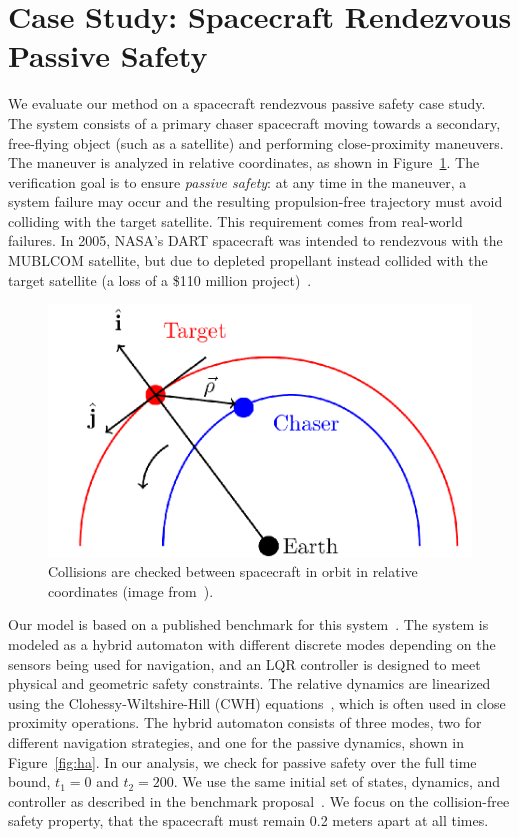 \section{Case Study: Spacecraft Rendezvous Passive Safety}
\label{sec:casestudy}

We evaluate our method on a spacecraft rendezvous passive safety case study. The system consists of a primary chaser spacecraft moving towards a secondary, free-flying object (such as a satellite) and performing close-proximity maneuvers.
%
The maneuver is analyzed in relative coordinates, as shown in Figure~\ref{fig:chaser}.
%
The verification goal is to ensure \emph{passive safety}: at any time in the maneuver, a system failure may occur and the resulting propulsion-free trajectory must avoid colliding with the target satellite.
%
This requirement comes from real-world failures. In 2005, NASA’s DART spacecraft was intended to rendezvous with the MUBLCOM satellite, but due to depleted propellant instead collided with the target satellite (a loss of a
\$110 million project)~\cite{croomes2006overview}.

\begin{figure}[t]
\centerline{\includegraphics[width=0.5\columnwidth]{images/chaser.png}}
\caption{Collisions are checked between spacecraft in orbit in relative coordinates (image from~\cite{chan2017verifying}).}
\label{fig:chaser}
\end{figure}

Our model is based on a published benchmark for this system~\cite{chan2017verifying,jewison2016spacecraft}. The system is modeled as a hybrid automaton with different discrete modes depending on the sensors being used for navigation, and an LQR controller is designed to meet physical and geometric safety constraints.
%
The relative dynamics are linearized using the Clohessy-Wiltshire-Hill (CWH) equations~\cite{wh1960terminal}, which is often used in close proximity operations. The hybrid automaton consists of three modes, two for different navigation strategies, and one for the passive dynamics, shown in Figure~\ref{fig:ha}.
%
In our analysis, we check for passive safety over the full time bound, $t_1=0$ and $t_2=200$.
%
We use the same initial set of states, dynamics, and controller as described in the benchmark proposal~\cite{chan2017verifying}.
%
We focus on the collision-free safety property, that the spacecraft must remain 0.2 meters apart at all times.

